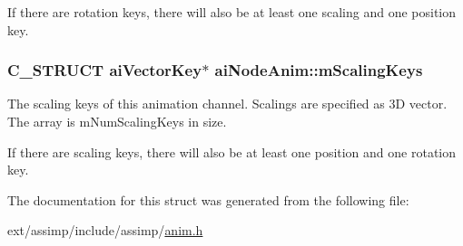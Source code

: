 If there are rotation keys, there will also be at least one scaling and one position key. \hypertarget{structai_node_anim_a4588122722d5148d6e590da820bdf35f}{
\subsubsection[{m\-Scaling\-Keys}]{\setlength{\rightskip}{0pt plus 5cm}C\-\_\-\-S\-T\-R\-U\-C\-T {\bf ai\-Vector\-Key}$\ast$ ai\-Node\-Anim\-::m\-Scaling\-Keys}}\label{structai_node_anim_a4588122722d5148d6e590da820bdf35f}
The scaling keys of this animation channel. Scalings are specified as 3\-D vector. The array is m\-Num\-Scaling\-Keys in size.

If there are scaling keys, there will also be at least one position and one rotation key. 

The documentation for this struct was generated from the following file\-:\begin{DoxyCompactItemize}
\item 
ext/assimp/include/assimp/\hyperlink{anim_8h}{anim.\-h}\end{DoxyCompactItemize}

